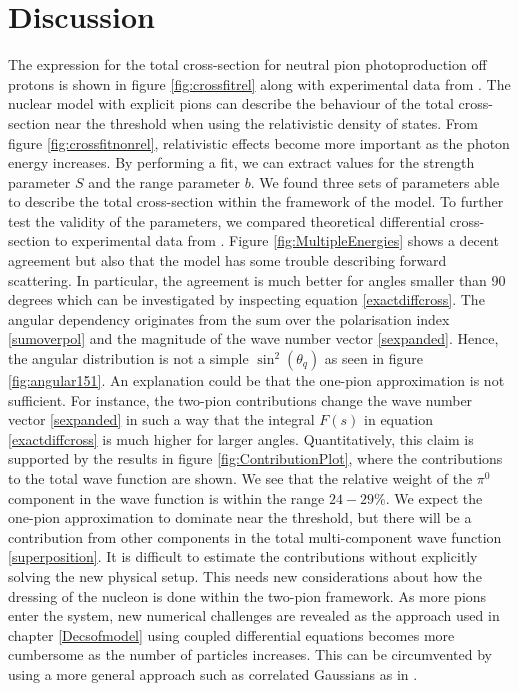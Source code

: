 \section{Discussion}\label{sec:discussion}
The expression for the total cross-section for neutral pion photoproduction off protons is shown in figure \ref{fig:crossfitrel} along with experimental data from \cite{Schmidt_2001}. The nuclear model with explicit pions can describe the behaviour of the total cross-section near the threshold when using the relativistic density of states. From figure \ref{fig:crossfitnonrel}, relativistic effects become more important as the photon energy increases. By performing a fit, we can extract values for the strength parameter $S$ and the range parameter $b$. We found three sets of parameters able to describe the total cross-section within the framework of the model. To further test the validity of the parameters, we compared theoretical differential cross-section to experimental data from \cite{BeckPion}. Figure \ref{fig:MultipleEnergies} shows a decent agreement but also that the model has some trouble describing forward scattering. In particular, the agreement is much better for angles smaller than 90 degrees which can be investigated by inspecting equation \eqref{exactdiffcross}. The angular dependency originates from the sum over the polarisation index \eqref{sumoverpol} and the magnitude of the wave number vector \eqref{sexpanded}. Hence, the angular distribution is not a simple $\sin^2(\theta_q)$ as seen in figure \ref{fig:angular151}. An explanation could be that the one-pion approximation is not sufficient. For instance, the two-pion contributions change the wave number vector \eqref{sexpanded} in such a way that the integral $F(s)$ in equation \eqref{exactdiffcross} is much higher for larger angles. Quantitatively, this claim is supported by the results in figure \ref{fig:ContributionPlot}, where the contributions to the total wave function are shown. We see that the relative weight of the $\pi^0$ component in the wave function is within the range $24-29\%$. We expect the one-pion approximation to dominate near the threshold, but there will be a contribution from other components in the total multi-component wave function \eqref{superposition}. It is difficult to estimate the contributions without explicitly solving the new physical setup. This needs new considerations about how the dressing of the nucleon is done within the two-pion framework. As more pions enter the system, new numerical challenges are revealed as the approach used in chapter \ref{Decsofmodel} using coupled differential equations becomes more cumbersome as the number of particles increases. This can be circumvented by using a more general approach such as correlated Gaussians as in \cite{Fedorov2020}. 


